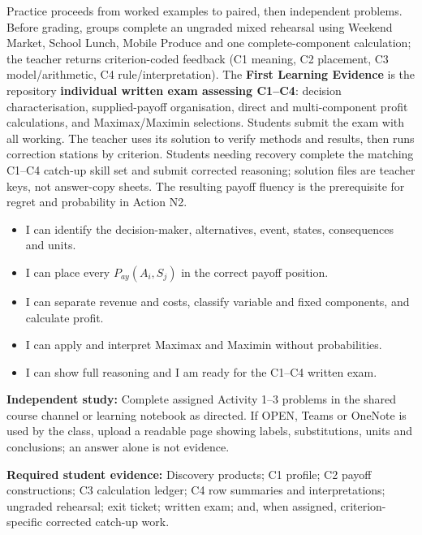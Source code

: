 \documentclass[10pt,letterpaper]{article}
\newcommand{\labelled}[2]{\textbf{#1:} #2\par}
\newcommand{\partheading}[1]{\Needspace{6\baselineskip}\par\vspace{5pt}{\bfseries #1\par}\vspace{1pt}}
\newcommand{\evidenceitem}[1]{\item[$\square$] #1}
\begin{document}
\begin{bluebox}
		\partheading{Practice and Assessment---First Learning Evidence}
		Practice proceeds from worked examples to paired, then independent problems.
		Before grading, groups complete an ungraded mixed rehearsal using Weekend
		Market, School Lunch, Mobile Produce and one complete-component calculation;
		the teacher returns criterion-coded feedback (C1 meaning, C2 placement, C3
		model/arithmetic, C4 rule/interpretation). The \textbf{First Learning Evidence}
		is the repository \textbf{individual written exam assessing C1--C4}: decision
		characterisation, supplied-payoff organisation, direct and multi-component
		profit calculations, and Maximax/Maximin selections. Students submit the exam
		with all working. The teacher uses its solution to verify methods and results,
		then runs correction stations by criterion. Students needing recovery complete
		the matching C1--C4 catch-up skill set and submit corrected reasoning; solution
		files are teacher keys, not answer-copy sheets. The resulting payoff fluency is
		the prerequisite for regret and probability in Action N2.
		
		\partheading{Exit Ticket N1}
		\begin{itemize}[leftmargin=1.8em,itemsep=1pt]
			\evidenceitem{I can identify the decision-maker, alternatives, event, states, consequences and units.}
			\evidenceitem{I can place every $P_{ay}(A_i,S_j)$ in the correct payoff position.}
			\evidenceitem{I can separate revenue and costs, classify variable and fixed components, and calculate profit.}
			\evidenceitem{I can apply and interpret Maximax and Maximin without probabilities.}
			\evidenceitem{I can show full reasoning and I am ready for the C1--C4 written exam.}
		\end{itemize}
		
		\labelled{Independent study}{Complete assigned Activity 1--3 problems in the shared course channel or learning notebook as directed. If OPEN, Teams or OneNote is used by the class, upload a readable page showing labels, substitutions, units and conclusions; an answer alone is not evidence.}
		\labelled{Required student evidence}{Discovery products; C1 profile; C2 payoff constructions; C3 calculation ledger; C4 row summaries and interpretations; ungraded rehearsal; exit ticket; written exam; and, when assigned, criterion-specific corrected catch-up work.}
	\end{bluebox}
	
	\vspace{0.18in}
	
\end{document}
